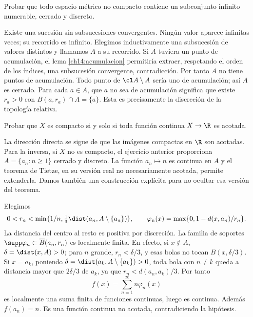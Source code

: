 \begin{ejercicio}
Probar que todo espacio métrico no compacto contiene un subconjunto infinito numerable, cerrado y discreto.
\end{ejercicio}
\begin{solucion}
Existe una sucesión sin subsucesiones convergentes. Ningún valor aparece infinitas veces; su recorrido es infinito. Elegimos inductivamente una subsucesión de valores distintos y llamamos $A$ a su recorrido. Si $A$ tuviera un punto de acumulación, el lema \ref{ch14:acumulacion} permitiría extraer, respetando el orden de los índices, una subsucesión convergente, contradicción. Por tanto $A$ no tiene puntos de acumulación. Todo punto de $\cl A\setminus A$ sería uno de acumulación; así $A$ es cerrado. Para cada $a\in A$, que $a$ no sea de acumulación significa que existe $r_a>0$ con $B(a,r_a)\cap A=\{a\}$. Esta es precisamente la discreción de la topología relativa.
\end{solucion}

\begin{ejercicio}
Probar que $X$ es compacto si y solo si toda función continua $X\to\R$ es acotada.
\end{ejercicio}
\begin{solucion}
La dirección directa se sigue de que las imágenes compactas en $\R$ son acotadas. Para la inversa, si $X$ no es compacto, el ejercicio anterior proporciona $A=\{a_n:n\ge1\}$ cerrado y discreto. La función $a_n\mapsto n$ es continua en $A$ y el teorema de Tietze, en su versión real no necesariamente acotada, permite extenderla. Damos también una construcción explícita para no ocultar esa versión del teorema.

Elegimos
\[
0<r_n<\min\{1/n,\tfrac13\dist(a_n,A\setminus\{a_n\})\},\qquad
\varphi_n(x)=\max\{0,1-d(x,a_n)/r_n\}.
\]
La distancia del centro al resto es positiva por discreción. La familia de soportes $\supp\varphi_n\subset\overline B(a_n,r_n)$ es localmente finita. En efecto, si $x\notin A$, $\delta=\dist(x,A)>0$; para $n$ grande, $r_n<\delta/3$, y esas bolas no tocan $B(x,\delta/3)$. Si $x=a_k$, poniendo $\delta=\dist(a_k,A\setminus\{a_k\})>0$, toda bola con $n\ne k$ queda a distancia mayor que $2\delta/3$ de $a_k$, ya que $r_n<d(a_n,a_k)/3$. Por tanto
\[
f(x)=\sum_{n=1}^\infty n\varphi_n(x)
\]
es localmente una suma finita de funciones continuas, luego es continua. Además $f(a_n)=n$. Es una función continua no acotada, contradiciendo la hipótesis.
\end{solucion}

